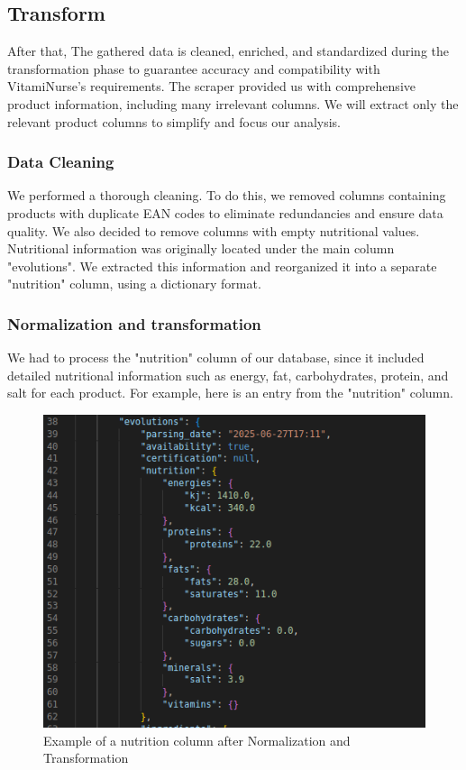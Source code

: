 \subsection{Transform}
After that, The gathered data is cleaned, enriched, and standardized
during the transformation phase to guarantee accuracy and compatibility with VitamiNurse’s requirements.
The scraper provided us with comprehensive product information, including many irrelevant columns. We will extract only the relevant product columns to simplify and focus our
analysis.

\subsubsection{Data Cleaning}
We performed a thorough cleaning. To do this, we removed columns
containing products with duplicate EAN codes to eliminate redundancies
and ensure data quality. We also decided to remove columns with
empty nutritional values. Nutritional information was originally located
under the main column "evolutions". We extracted this information and
reorganized it into a separate "nutrition" column, using a dictionary
format.


\subsubsection{Normalization and transformation}

We had to process the "nutrition" column of our database, since it included detailed nutritional information such as energy, fat, carbohydrates,
protein, and salt for each product. For example, here is an entry from
the "nutrition" column.

\begin{center}
\begin{figure}[H]
    \centering
    \includegraphics[scale=0.39]{images/transform_nutrition.png}
    \caption{Example of a nutrition column after Normalization and Transformation} 
    \label{fig:Normalization_nutrition}
\end{figure}
\end{center}

